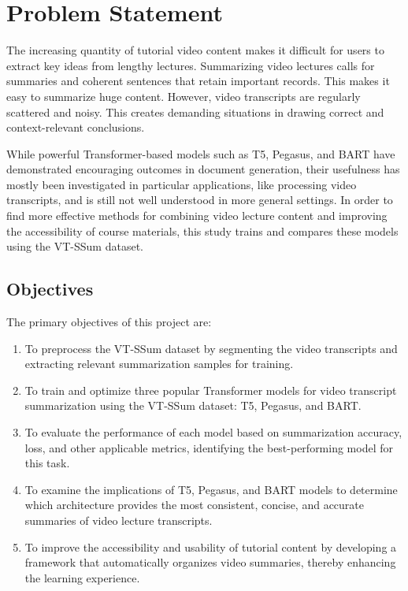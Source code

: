 \documentclass[conference]{IEEEtran}
\begin{document}
\section{Problem Statement}
The increasing quantity of tutorial video content makes it difficult for users to extract key ideas from lengthy lectures. Summarizing video lectures calls for summaries and coherent sentences that retain important records. This makes it easy to summarize huge content. However, video transcripts are regularly scattered and noisy. This creates demanding situations in drawing correct and context-relevant conclusions.

While powerful Transformer-based models such as T5, Pegasus, and BART have demonstrated encouraging outcomes in document generation, their usefulness has mostly been investigated in particular applications, like processing video transcripts, and is still not well understood in more general settings. In order to find more effective methods for combining video lecture content and improving the accessibility of course materials, this study trains and compares these models using the VT-SSum dataset.

\subsection{Objectives}
The primary objectives of this project are:
\begin{enumerate}
    \item To preprocess the VT-SSum dataset by segmenting the video transcripts and extracting relevant summarization samples for training.
    \item To train and optimize three popular Transformer models for video transcript summarization using the VT-SSum dataset: T5, Pegasus, and BART.
    \item To evaluate the performance of each model based on summarization accuracy, loss, and other applicable metrics, identifying the best-performing model for this task.
    \item To examine the implications of T5, Pegasus, and BART models to determine which architecture provides the most consistent, concise, and accurate summaries of video lecture transcripts.
    \item To improve the accessibility and usability of tutorial content by developing a framework that automatically organizes video summaries, thereby enhancing the learning experience.
\end{enumerate}
\end{document}
